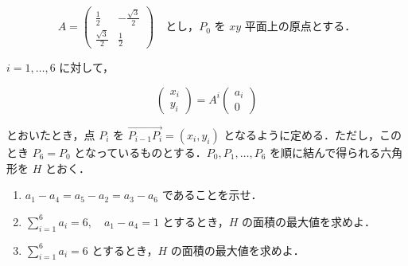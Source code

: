 \[
  A =
  \begin{pmatrix}
    \frac{1}{2}        & -\frac{\sqrt{3}}{2} \\
    \frac{\sqrt{3}}{2} & \frac{1}{2}
  \end{pmatrix}
  \quad \text{とし，} P_0 \text{ を } xy \text{ 平面上の原点とする．}
\]

$i = 1, \dots, 6$ に対して，

\[
  \begin{pmatrix}
    x_i \\
    y_i
  \end{pmatrix}
  = A^i
  \begin{pmatrix}
    a_i \\
    0
  \end{pmatrix}
\]

とおいたとき，点 $P_i$ を $\overrightarrow{P_{i-1}P_i} = (x_i, y_i)$ となるように定める．ただし，このとき $P_6 = P_0$ となっているものとする．$P_0, P_1, \dots, P_6$ を順に結んで得られる六角形を $H$ とおく．

\begin{enumerate}
  \item[(1)] $a_1 - a_4 = a_5 - a_2 = a_3 - a_6$ であることを示せ．
  \item[(2)] $\sum_{i=1}^6 a_i = 6,\quad a_1 - a_4 = 1$ とするとき，$H$ の面積の最大値を求めよ．
  \item[(3)] $\sum_{i=1}^6 a_i = 6$ とするとき，$H$ の面積の最大値を求めよ．
\end{enumerate}
